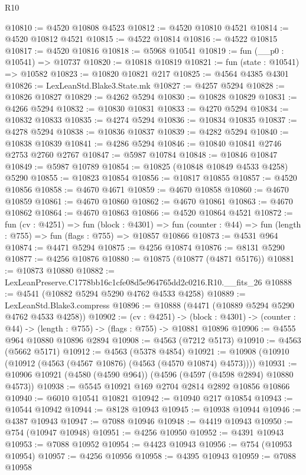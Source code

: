 \begin{lexlean}{R10}
\begin{coremodule}
@10810 := @4520 @10808 @4523
@10812 := @4520 @10810 @4521
@10814 := @4520 @10812 @4521
@10815 := @4522 @10814
@10816 := @4522 @10815
@10817 := @4520 @10816
@10818 := @5968 @10541
@10819 := fun (__p0 : @10541) => @10737
@10820 := @10818 @10819
@10821 := fun (state : @10541) => @10582
@10823 := @10820 @10821 @217
@10825 := @4564 @4385 @4301
@10826 := LexLeanStd.Blake3.State.mk
@10827 := @4257 @5294
@10828 := @10826 @10827
@10829 := @4262 @5294
@10830 := @10828 @10829
@10831 := @4266 @5294
@10832 := @10830 @10831
@10833 := @4270 @5294
@10834 := @10832 @10833
@10835 := @4274 @5294
@10836 := @10834 @10835
@10837 := @4278 @5294
@10838 := @10836 @10837
@10839 := @4282 @5294
@10840 := @10838 @10839
@10841 := @4286 @5294
@10846 := @10840 @10841 @2746 @2753 @2760 @2767
@10847 := @5987 @10784
@10848 := @10846 @10847
@10849 := @5987 @10789
@10854 := @10825 (@10848 @10849 @4533 @4258) @5290
@10855 := @10823 @10854
@10856 := @10817 @10855
@10857 := @4520 @10856
@10858 := @4670 @4671
@10859 := @4670 @10858
@10860 := @4670 @10859
@10861 := @4670 @10860
@10862 := @4670 @10861
@10863 := @4670 @10862
@10864 := @4670 @10863
@10866 := @4520 @10864 @4521
@10872 := fun (cv : @4251) =>
  fun (block : @4301) =>
  fun (counter : @44) => fun (length : @755) => fun (flags : @755) => @10857 @10866
@10873 := @4531 @964
@10874 := @4471 @5294
@10875 := @4256 @10874
@10876 := @8131 @5290
@10877 := @4256 @10876
@10880 := @10875 (@10877 (@4871 @5176))
@10881 := @10873 @10880
@10882 := LexLeanPreserve.C1778bb16c1cfe08d5e964765dd2c0216.R10.__fits_26
@10888 := @4541 (@10882 @5294 @5290 @4762 @4533 @4258)
@10889 := LexLeanStd.Blake3.compress
@10896 := @10888 (@4471 (@10889 @5294 @5290 @4762 @4533 @4258))
@10902 := (cv : @4251) ->
  (block : @4301) -> (counter : @44) -> (length : @755) -> (flags : @755) -> @10881 @10896
@10906 := @4555 @964 @10880 @10896 @2894
@10908 := @4563 (@7212 @5173)
@10910 := @4563 (@5662 @5171)
@10912 := @4563 (@5378 @4854)
@10921 := @10908 (@10910 (@10912 (@4563 (@4567 @10876) (@4563 (@4570 @10874) @4573))))
@10931 := @10906 @10921 (@4580 (@4590 @964)) (@4596 (@4597 (@4598 @2894) @10880 @4573))
@10938 := @5545 @10921 @169 @2704 @2814 @2892 @10856 @10866
@10940 := @6010 @10541 @10821
@10942 := @10940 @217 @10854
@10943 := @10544 @10942
@10944 := @8128 @10943
@10945 := @10938 @10944
@10946 := @4387 @10943
@10947 := @7088 @10946
@10948 := @4419 @10943
@10950 := @754 (@10947 @10948)
@10951 := @4256 @10950
@10952 := @4391 @10943
@10953 := @7088 @10952
@10954 := @4423 @10943
@10956 := @754 (@10953 @10954)
@10957 := @4256 @10956
@10958 := @4395 @10943
@10959 := @7088 @10958

\end{coremodule}
\end{lexlean}
